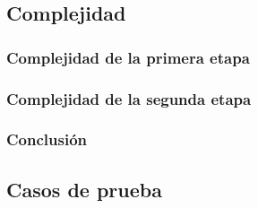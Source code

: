 \subsection{Complejidad}

\subsubsection{Complejidad de la primera etapa}
\subsubsection{Complejidad de la segunda etapa}
\subsubsection{Conclusión}

\subsection{Casos de prueba}